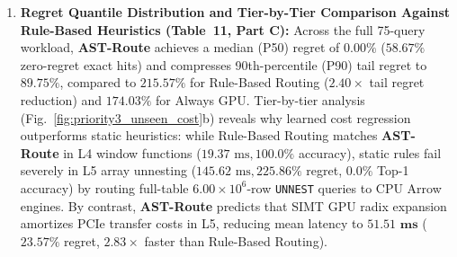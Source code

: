 \documentclass[10pt,a4paper]{article}
\begin{document}
\begin{enumerate}[leftmargin=1.5em,itemsep=2pt]
    \item \textbf{Regret Quantile Distribution and Tier-by-Tier Comparison Against Rule-Based Heuristics (Table~11, Part C):} Across the full 75-query workload, \textbf{AST-Route} achieves a median (P50) regret of $\mathbf{0.00\%}$ ($58.67\%$ zero-regret exact hits) and compresses 90th-percentile (P90) tail regret to $\mathbf{89.75\%}$, compared to $215.57\%$ for Rule-Based Routing ($2.40\times$ tail regret reduction) and $174.03\%$ for Always GPU. Tier-by-tier analysis (Fig.~\ref{fig:priority3_unseen_cost}b) reveals why learned cost regression outperforms static heuristics: while Rule-Based Routing matches \textbf{AST-Route} in L4 window functions ($19.37\text{ ms}, 100.0\%$ accuracy), static rules fail severely in L5 array unnesting ($145.62\text{ ms}, 225.86\%$ regret, $0.0\%$ Top-1 accuracy) by routing full-table $6.00\times 10^6$-row \texttt{UNNEST} queries to CPU Arrow engines. By contrast, \textbf{AST-Route} predicts that SIMT GPU radix expansion amortizes PCIe transfer costs in L5, reducing mean latency to $\mathbf{51.51\text{ ms}}$ ($23.57\%$ regret, $\mathbf{2.83\times}$ faster than Rule-Based Routing).
\end{enumerate}
\end{document}
